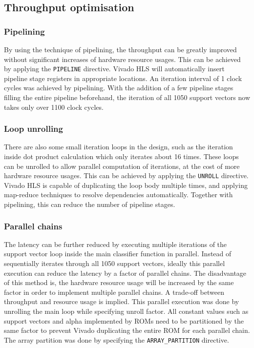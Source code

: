 \documentclass[journal]{IEEEtran}
\begin{document}
\subsection{Throughput optimisation}

\subsubsection{Pipelining}

By using the technique of pipelining, the throughput can be greatly improved without significant increases of hardware resource usages. This can be achieved by applying the \texttt{PIPELINE} directive. Vivado HLS will automatically insert pipeline stage registers in appropriate locations. An iteration interval of 1 clock cycles was achieved by pipelining. With the addition of a few pipeline stages filling the entire pipeline beforehand, the iteration of all 1050 support vectors now takes only over 1100 clock cycles.

\subsubsection{Loop unrolling}

There are also some small iteration loops in the design, such as the iteration inside dot product calculation which only iterates about 16 times. These loops can be unrolled to allow parallel computation of iterations, at the cost of more hardware resource usages. This can be achieved by applying the \texttt{UNROLL} directive. Vivado HLS is capable of duplicating the loop body multiple times, and applying map-reduce techniques to resolve dependencies automatically. Together with pipelining, this can reduce the number of pipeline stages.

\subsubsection{Parallel chains}

The latency can be further reduced by executing multiple iterations of the support vector loop inside the main classifier function in parallel. Instead of sequentially iterates through all 1050 support vectors, ideally this parallel execution can reduce the latency by a factor of parallel chains.
The disadvantage of this method is, the hardware resource usage will be increased by the same factor in order to implement multiple parallel chains. A trade-off between throughput and resource usage is implied.
This parallel execution was done by unrolling the main loop while specifying unroll factor. All constant values such as support vectors and alpha implemented by ROMs need to be partitioned by the same factor to prevent Vivado duplicating the entire ROM for each parallel chain. The array partition was done by specifying the \texttt{ARRAY\_PARTITION} directive.
\end{document}
